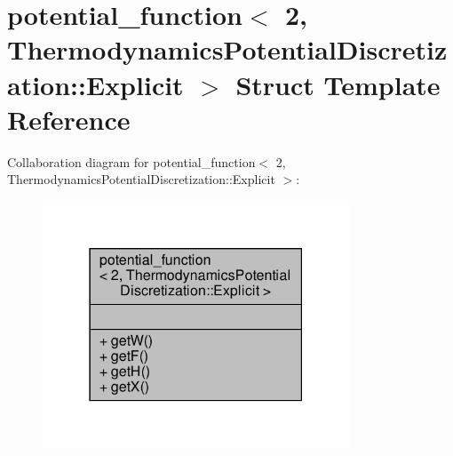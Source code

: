 \hypertarget{structpotential__function_3_012_00_01ThermodynamicsPotentialDiscretization_1_1Explicit_01_4}{}\section{potential\+\_\+function$<$ 2, Thermodynamics\+Potential\+Discretization\+:\+:Explicit $>$ Struct Template Reference}
\label{structpotential__function_3_012_00_01ThermodynamicsPotentialDiscretization_1_1Explicit_01_4}


Collaboration diagram for potential\+\_\+function$<$ 2, Thermodynamics\+Potential\+Discretization\+:\+:Explicit $>$\+:\nopagebreak
\begin{figure}[H]
\begin{center}
\leavevmode
\includegraphics[width=259pt]{structpotential__function_3_012_00_01ThermodynamicsPotentialDiscretization_1_1Explicit_01_4__coll__graph}
\end{center}
\end{figure}
